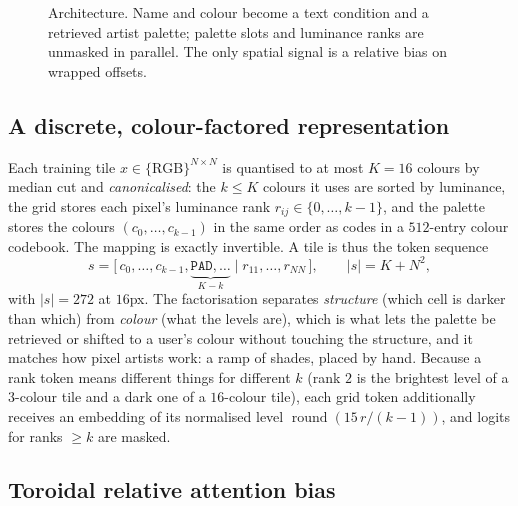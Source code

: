 \documentclass{article}
\begin{document}
\begin{figure}[h]
{}
\caption{Architecture. Name and colour become a text condition and a retrieved
artist palette; palette slots and luminance ranks are unmasked in parallel.
The only spatial signal is a relative bias on wrapped offsets.}
\label{fig:overview}
\end{figure}

\subsection{A discrete, colour-factored representation}
\label{sec:repr}

Each training tile $x\in\{\text{RGB}\}^{N\times N}$ is quantised to at most
$K=16$ colours by median cut and \emph{canonicalised}: the $k\le K$ colours it
uses are sorted by luminance, the grid stores each pixel's luminance rank
$r_{ij}\in\{0,\dots,k-1\}$, and the palette stores the colours
$(c_0,\dots,c_{k-1})$ in the same order as codes in a $512$-entry colour
codebook. The mapping is exactly invertible. A tile is thus the token sequence
\begin{equation}
  s = \big[\,c_0,\dots,c_{k-1},\underbrace{\texttt{PAD},\dots}_{K-k}\;\big|\; r_{11},\dots,r_{NN}\,\big],
  \qquad |s| = K + N^2,
\end{equation}
with $|s|=272$ at $16$px. The factorisation separates \emph{structure} (which
cell is darker than which) from \emph{colour} (what the levels are), which is
what lets the palette be retrieved or shifted to a user's colour without
touching the structure, and it matches how pixel artists work: a ramp of
shades, placed by hand. Because a rank token means different things for
different $k$ (rank $2$ is the brightest level of a $3$-colour tile and a dark
one of a $16$-colour tile), each grid token additionally receives an embedding
of its normalised level $\operatorname{round}(15\,r/(k-1))$, and logits for
ranks $\ge k$ are masked.

\subsection{Toroidal relative attention bias}
\label{sec:bias}
\end{document}
